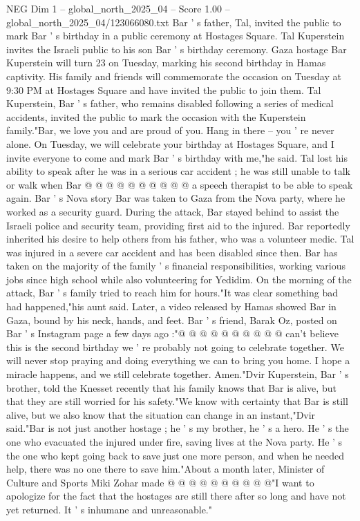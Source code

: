 \begin{textsample}{NEG Dim 1 – global\_north\_2025\_04 – Score 1.00 – global\_north\_2025\_04/123066080.txt}  \label{ex:f1_neg_039}
Bar ' s father, Tal, invited the public to mark Bar ' s birthday in a public ceremony at Hostages Square.
Tal Kuperstein invites the Israeli public to his son Bar ' s birthday ceremony.
Gaza hostage Bar Kuperstein will turn 23 on Tuesday, marking his second birthday in Hamas captivity.
His family and friends will commemorate the occasion on Tuesday at 9:30 PM at Hostages Square and have invited the public to join them.
Tal Kuperstein, Bar ' s father, who remains disabled following a series of medical accidents, invited the public to mark the occasion with the Kuperstein family."Bar, we love you and are proud of you.
Hang in there -- you ' re never alone.
On Tuesday, we will celebrate your birthday at Hostages Square, and I invite everyone to come and mark Bar ' s birthday with me,"he said.
Tal lost his ability to speak after he was in a serious car accident ; he was still unable to talk or walk when Bar @ @ @ @ @ @ @ @ @ @ a speech therapist to be able to speak again.
Bar ' s Nova story Bar was taken to Gaza from the Nova party, where he worked as a security guard.
During the attack, Bar stayed behind to assist the Israeli police and security team, providing first aid to the injured.
Bar reportedly inherited his desire to help others from his father, who was a volunteer medic.
Tal was injured in a severe car accident and has been disabled since then.
Bar has taken on the majority of the family ' s financial responsibilities, working various jobs since high school while also volunteering for Yedidim.
On the morning of the attack, Bar ' s family tried to reach him for hours."It was clear something bad had happened,"his aunt said.
Later, a video released by Hamas showed Bar in Gaza, bound by his neck, hands, and feet.
Bar ' s friend, Barak Oz, posted on Bar ' s Instagram page a few days ago :"@ @ @ @ @ @ @ @ @ @ can't believe this is the second birthday we ' re probably not going to celebrate together.
We will never stop praying and doing everything we can to bring you home.
I hope a miracle happens, and we still celebrate together.
Amen."Dvir Kuperstein, Bar ' s brother, told the Knesset recently that his family knows that Bar is alive, but that they are still worried for his safety."We know with certainty that Bar is still alive, but we also know that the situation can change in an instant,"Dvir said."Bar is not just another hostage ; he ' s my brother, he ' s a hero.
He ' s the one who evacuated the injured under fire, saving lives at the Nova party.
He ' s the one who kept going back to save just one more person, and when he needed help, there was no one there to save him."About a month later, Minister of Culture and Sports Miki Zohar made @ @ @ @ @ @ @ @ @ @"I want to apologize for the fact that the hostages are still there after so long and have not yet returned.
It ' s inhumane and unreasonable."

\end{textsample}

